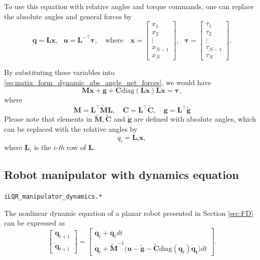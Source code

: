 \documentclass[10pt,a4paper]{article} %
\newcommand{\trsp}{{\scriptscriptstyle\top}}
\newcommand{\filename}[1]{\colorbox{rr2}{\color{white}\texttt{#1}}}
\begin{document}
To use this equation with relative angles and torque commands, one can replace the absolute angles and general forces by 
\begin{equation*}
    \bm{q} = \bm{L} \bm{x},  \ \ \  \bm{u} = \bm{L}^{-\trsp} \bm{\tau},
	\quad\text{where}\quad
	\bm{x}= \begin{bmatrix}
	x_1 \\ x_2 \\ \vdots \\ x_{N-1} \\ x_N 
	\end{bmatrix}, \ \ \ \bm{\tau}= \begin{bmatrix}
	\tau_1 \\ \tau_2 \\ \vdots \\ \tau_{N-1} \\ \tau_N 
	\end{bmatrix}.
\end{equation*}

By substituting these variables into \eqref{eq:matix_form_dynamic_abs_angle_net_forces}, we would have
\begin{equation}\label{eq:matix_form_dynamic_rel_angle_abs_forces}
\bm{M}\ddot{\bm{x}} + \bm{g} + \bm{C}\text{diag}(\bm{L\dot{x}})\bm{L\dot{x}} = \bm{\tau},
\end{equation}
where
\begin{equation*}
	\bm{M} = \bm{L}^\trsp \tilde{\bm{M}} \bm{L},\quad
	\bm{C} = \bm{L}^\trsp \tilde{\bm{C}},\quad
	\bm{g} = \bm{L}^\trsp \tilde{\bm{g}}  
\end{equation*}
Please note that elements in $\tilde{\bm{M}}, \tilde{\bm{C}}$ and $\tilde{\bm{g}}$ are defined with absolute angles, which can be replaced with the relative angles by
\begin{equation*}
q_i = \bm{L}_i \bm{x},
\end{equation*} 
where $\bm{L}_i$ is the $i$-\emph{th} row of $\bm{L}$.


\newpage
\subsection{Robot manipulator with dynamics equation}
\begin{flushright}
\filename{iLQR\_manipulator\_dynamics.*}
\end{flushright}

The nonlinear dynamic equation of a planar robot presented in Section \ref{sec:FD} can be expressed as 
\begin{equation}
	\begin{bmatrix} \bm{q}_{t+1} \\ \dot{\bm{q}}_{t+1}
	\end{bmatrix}= \begin{bmatrix} \bm{q}_{t} + \dot{\bm{q}}_{t}  dt \\ \dot{\bm{q}}_{t} + \tilde{\bm{M}}^{-1}\Big(\bm{u} - \tilde{\bm{g}} - \tilde{\bm{C}}\text{diag}(\bm{\dot{q}}_t)\bm{\dot{q}_t}\Big) dt
	\end{bmatrix}.
	\label{eq:dis_dynamic}
\end{equation}
\end{document}
